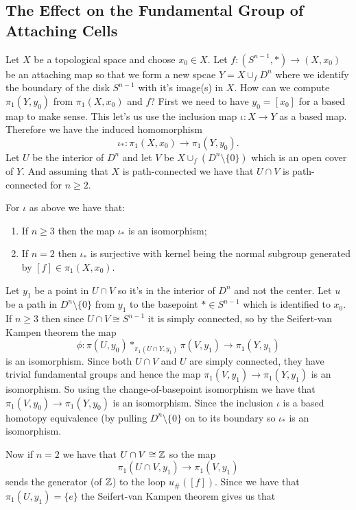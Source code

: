 \documentclass{article}
\begin{document}
\subsection{The Effect on the Fundamental Group of Attaching Cells}
Let $ X $ be a topological space and choose $ x_0\in X $. Let $ f: (S^{n-1}, *) \to (X,x_0) $ be an attaching map so that we form a new spcae $ Y = X \cup_f D^n $ where we identify the boundary of the disk $ S^{n-1} $ with it's image(s) in $ X $. How can we compute $ \pi_1(Y,y_0) $ from $ \pi_1(X,x_0) $ and $ f $? First we need to have $ y_0 = [x_0] $ for a based map to make sense. This let's us use the inclusion map $ \iota: X\to Y $ as a based map. Therefore we have the induced homomorphism
\[
  \iota_*: \pi_1(X,x_0) \to \pi_1(Y,y_0).
\]
Let $ U $ be the interior of $ D^n $ and let $ V $ be $ X \cup_f (D^n\setminus \{0\}) $ which is an open cover of $ Y $. And assuming that $ X $ is path-connected we have that $ U\cap V $ is path-connected for $ n\ge 2 $.
\begin{theorem}
  For $ \iota $ as above we have that:
  \begin{enumerate}
	  \item If $ n\ge 3 $ then the map $ \iota_* $ is an isomorphism;
	  \item If $ n = 2 $ then $ \iota_* $ is surjective with kernel being the normal subgroup generated by $ [f]\in \pi_1(X,x_0) $.
  \end{enumerate}
\end{theorem}
\pf Let $ y_1 $ be a point in $ U\cap V $ so it's in the interior of $ D^n $ and not the center. Let $ u $ be a path in $ D^n \setminus \{0\} $ from $ y_1 $ to the basepoint $ *\in S^{n-1} $ which is identified to $ x_0 $. If $ n\ge 3 $ then since $ U\cap V \cong S^{n-1} $ it is simply connected, so by the Seifert-van Kampen theorem the map
\[
	\phi: \pi(U,y_0) *_{\pi_1(U\cap Y,y_1)} \pi(V,y_1) \to \pi_1(Y,y_1)
\]
is an isomorphism. Since both $ U\cap V $ and $ U $ are simply connected, they have trivial fundamental groups and hence the map $ \pi_1(V,y_1) \to \pi_1(Y,y_1) $ is an isomorphism. So using the change-of-basepoint isomorphism we have that $ \pi_1(V,y_0) \to \pi_1(Y,y_0) $ is an isomorphism. Since the inclusion $ \iota $ is a based homotopy equivalence (by pulling $ D^n\setminus \{0\} $ on to its boundary so $ \iota_* $ is an isomorphism.\par
Now if $ n = 2 $ we have that $ U\cap V\cong \mathbb{Z} $ so the map
\[
  \pi_1(U\cap V, y_1) \to \pi_1(V,y_1)
\]
sends the generator (of $ \mathbb{Z} $) to the loop $ u_{\#}([f]) $. Since we have that $ \pi_1(U,y_1) = \{e\} $ the Seifert-van Kampen theorem gives us that 
\end{document}
